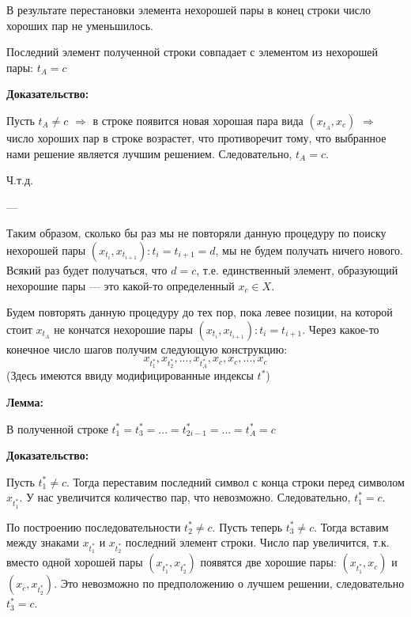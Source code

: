 \documentclass{article}
\begin{document}
   \begin{Comment}
   В результате перестановки элемента нехорошей пары в конец строки число хороших пар не уменьшилось.
   \end{Comment}
   
   \begin{Comment}
   	Последний элемент полученной строки совпадает с элементом из нехорошей пары: \(t_A = c\)
   \end{Comment}
	\textbf{Доказательство:}
	
   	Пусть \(t_A \neq c \) \(\Rightarrow\) в строке появится новая хорошая пара вида \( (x_{t_A}, x_{c} ) \) 
   	\(\Rightarrow\)
   	число хороших пар в строке возрастет, что противоречит тому, что выбранное нами решение является лучшим решением. Следовательно, \(t_A = c\).
   	
   	Ч.т.д.
   	
   	---

   

   
   Таким образом, сколько бы раз мы не повторяли данную процедуру по поиску нехорошей пары \( ( x_{t_{i}}, x_{t_{i+1}} ) :  t_{i} = t_{i+1} = d \), мы не будем получать ничего нового. Всякий раз будет получаться, что \(d = c\), т.е. единственный элемент, образующий нехорошие пары --- это какой-то определенный \(x_c \in X\).
   
   Будем повторять данную процедуру до тех пор, пока левее позиции, на которой стоит \(x_{t_A}\) не кончатся нехорошие пары \( ( x_{t_{i}}, x_{t_{i+1}} ) :  t_{i} = t_{i+1} \). Через какое-то конечное число шагов получим следующую конструкцию:
   \[
   x_{t^*_1}, x_{t^*_2}, ..., x_{t^*_A}, x_c, x_c, ..., x_c
   \]
   (Здесь имеются ввиду модифицированные индексы \(t^*\))
   
   \textbf{Лемма:} 
     
   В полученной строке \(t^*_1 = t^*_3 = ... = t^*_{2i-1} = ... = t_A^* = c \)
   
   \textbf{Доказательство:}
   
   Пусть \(t_1^* \neq c \). Тогда переставим последний символ с конца строки перед символом \(x_{t_1^*}\). У нас увеличится количество пар, что невозможно. Следовательно, \(t_1^* = c\).
   
   По построению последовательности \(t_2^* \neq c \). Пусть теперь \(t_3^* \neq c \). Тогда вставим между знаками \(x_{t_1^*}\) и \(x_{t_2^*}\) последний элемент строки. Число пар увеличится, т.к. вместо одной хорошей пары \( (x_{t_1^*}, x_{t_2^*} )\) появятся две хорошие пары:
   \( (x_{t_1^*}, x_c )\) и \( (x_c, x_{t_2^*} )\). Это невозможно по предположению о лучшем решении, следовательно \(t_3^* = c \).
   
\end{document}
